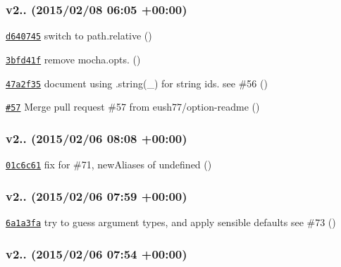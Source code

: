 \subsubsection*{v2.. (2015/02/08 06\+:05 +00\+:00)}


\begin{DoxyItemize}
\item \href{https://github.com/bcoe/yargs/commit/d640745a7b9f8d476e0223879d056d18d9c265c4}{\tt d640745} switch to path.\+relative ()
\item \href{https://github.com/bcoe/yargs/commit/3bfd41ff262a041f29d828b88936a79c63cad594}{\tt 3bfd41f} remove mocha.\+opts. ()
\item \href{https://github.com/bcoe/yargs/commit/47a2f357091db70903a402d6765501c1d63f15fe}{\tt 47a2f35} document using .string(\textquotesingle{}\+\_\+\textquotesingle{}) for string ids. see \#56 ()
\item \href{https://github.com/bcoe/yargs/pull/57}{\tt \#57} Merge pull request \#57 from eush77/option-\/readme ()
\end{DoxyItemize}

\subsubsection*{v2.. (2015/02/06 08\+:08 +00\+:00)}


\begin{DoxyItemize}
\item \href{https://github.com/bcoe/yargs/commit/01c6c61d67b4ebf88f41f0b32a345ec67f0ac17d}{\tt 01c6c61} fix for \#71, \textquotesingle{}new\+Aliases\textquotesingle{} of undefined ()
\end{DoxyItemize}

\subsubsection*{v2.. (2015/02/06 07\+:59 +00\+:00)}


\begin{DoxyItemize}
\item \href{https://github.com/bcoe/yargs/commit/6a1a3fa731958e26ccd56885f183dd8985cc828f}{\tt 6a1a3fa} try to guess argument types, and apply sensible defaults see \#73 ()
\end{DoxyItemize}

\subsubsection*{v2.. (2015/02/06 07\+:54 +00\+:00)}


